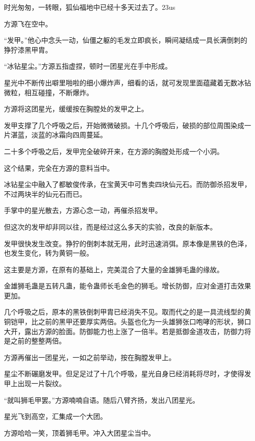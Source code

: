 
\begin{this_body}

时光匆匆，一转眼，狐仙福地中已经十多天过去了。23us

方源飞在空中。

“发甲。”他心中念头一动，仙僵之躯的毛发立即疯长，瞬间凝结成一具长满倒刺的狰狞漆黑甲胄。

“冰钻星尘。”方源五指虚捏，顿时一团星光在手中形成。

星光中不断传出噼里啪啦的细小爆炸声，细看的话，就可发现里面蕴藏着无数冰钻微粒，相互碰撞，不断爆炸。

方源将这团星光，缓缓按在胸膛处的发甲之上。

发甲支撑了几个呼吸之后，开始微微破损。十几个呼吸后，破损的部位周围染成一片湛蓝，淡蓝的冰霜向四周蔓延。

二十多个呼吸之后，发甲完全破碎开来，在方源的胸膛处形成一个小洞。

这个结果，完全在方源的意料当中。

冰钻星尘中融入了都敏俊传承，在宝黄天中可售卖四块仙元石。而防御杀招发甲，不过两块半的仙元石而已。

手掌中的星光散去，方源心念一动，再催杀招发甲。

但这次的发甲却非同以往，而是经过这么多天的实验，改良的新版本。

发甲很快发生改变。狰狞的倒刺本就无用，此时迅速消弭。原本像是黑铁的色泽，也发生变化，转为黄铜一般。

这主要是方源，在原有的基础上，完美混合了大量的金雄狮毛蛊的缘故。

金雄狮毛蛊是五转凡蛊，能令蛊师长毛金色的狮毛。增长防御，应对金道打击效果更加。

几个呼吸之后，原本的黑铁倒刺甲胄已经消失不见。取而代之的是一具流线型的黄铜铠甲，比之前的黑甲还要厚实两倍。头盔也化为一头雄狮张口咆哮的形状，狮口大开，露出方源的脸面。防御能力也上涨了一倍半。若是抵御金道攻击，防御力将是之前的整整两倍。

方源再催出一团星光，一如之前举动，按在胸膛发甲上。

星尘不断碾磨发甲。但足足过了十几个呼吸，星光自身已经消耗将尽时，才使得发甲上出现一片裂纹。

“就叫狮毛甲罢。”方源喃喃自语。随后八臂齐扬，发出八团星光。

星光飞到高空，汇集成一个大团。

方源哈哈一笑，顶着狮毛甲。冲入大团星尘当中。


\end{this_body}
